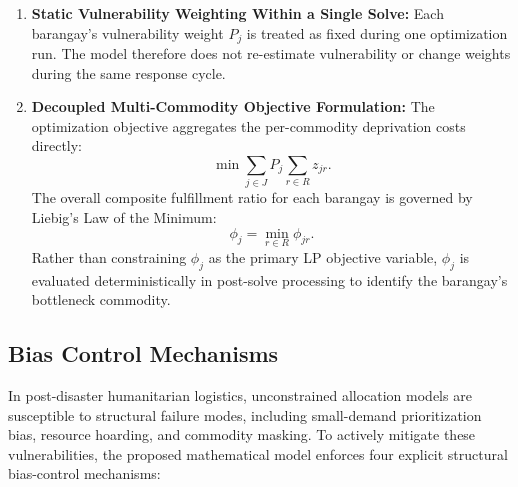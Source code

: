 \begin{enumerate}
    \item \textbf{Static Vulnerability Weighting Within a Single Solve:} Each barangay's vulnerability weight $P_j$ is treated as fixed during one optimization run. The model therefore does not re-estimate vulnerability or change weights during the same response cycle.

    \item \textbf{Decoupled Multi-Commodity Objective Formulation:} The optimization objective aggregates the per-commodity deprivation costs directly:
    \begin{equation}
        \min \sum_{j\in J} P_j \sum_{r\in R} z_{jr}.
    \end{equation}
    The overall composite fulfillment ratio for each barangay is governed by Liebig's Law of the Minimum:
    \begin{equation}
        \phi_j = \min_{r\in R}\phi_{jr}.
    \end{equation}
    Rather than constraining $\phi_j$ as the primary LP objective variable, $\phi_j$ is evaluated deterministically in post-solve processing to identify the barangay's bottleneck commodity.
\end{enumerate}

\subsection{Bias Control Mechanisms}
In post-disaster humanitarian logistics, unconstrained allocation models are susceptible to structural failure modes, including small-demand prioritization bias, resource hoarding, and commodity masking. To actively mitigate these vulnerabilities, the proposed mathematical model enforces four explicit structural bias-control mechanisms:

